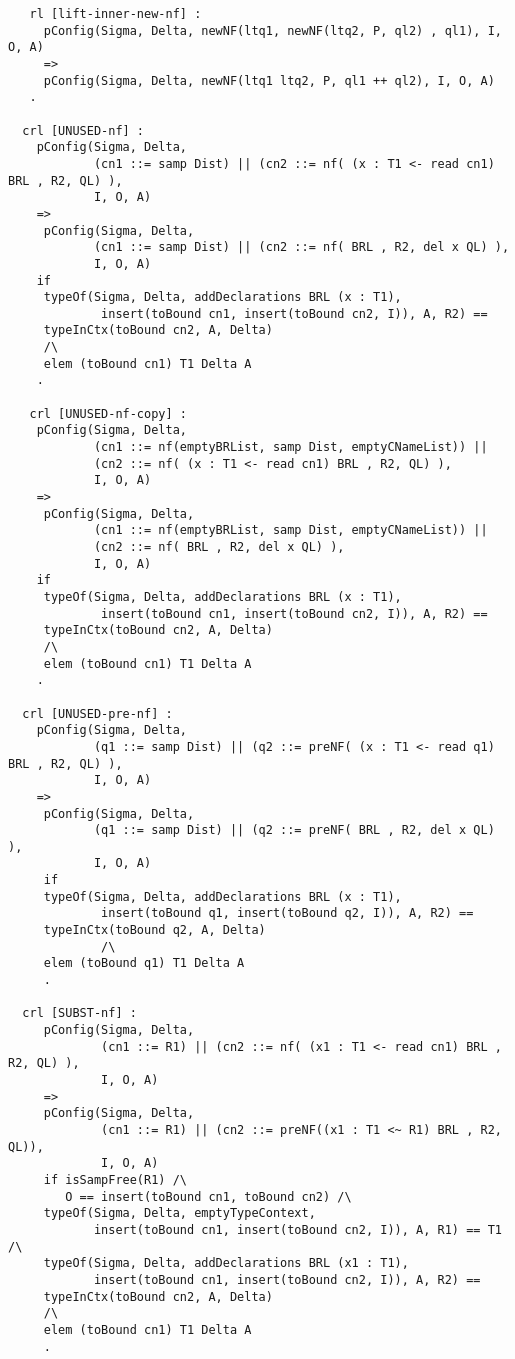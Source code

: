 \begin{lstlisting}
   rl [lift-inner-new-nf] :
     pConfig(Sigma, Delta, newNF(ltq1, newNF(ltq2, P, ql2) , ql1), I, O, A)
     => 
     pConfig(Sigma, Delta, newNF(ltq1 ltq2, P, ql1 ++ ql2), I, O, A)
   .
      
  crl [UNUSED-nf] :
    pConfig(Sigma, Delta,
            (cn1 ::= samp Dist) || (cn2 ::= nf( (x : T1 <- read cn1) BRL , R2, QL) ),
            I, O, A) 
    =>           
     pConfig(Sigma, Delta,
            (cn1 ::= samp Dist) || (cn2 ::= nf( BRL , R2, del x QL) ),
            I, O, A) 
    if
     typeOf(Sigma, Delta, addDeclarations BRL (x : T1), 
             insert(toBound cn1, insert(toBound cn2, I)), A, R2) ==
     typeInCtx(toBound cn2, A, Delta)
     /\
     elem (toBound cn1) T1 Delta A        
    . 
    
   crl [UNUSED-nf-copy] :
    pConfig(Sigma, Delta,
            (cn1 ::= nf(emptyBRList, samp Dist, emptyCNameList)) || 
            (cn2 ::= nf( (x : T1 <- read cn1) BRL , R2, QL) ),
            I, O, A) 
    =>           
     pConfig(Sigma, Delta,
            (cn1 ::= nf(emptyBRList, samp Dist, emptyCNameList)) || 
            (cn2 ::= nf( BRL , R2, del x QL) ),
            I, O, A) 
    if 
     typeOf(Sigma, Delta, addDeclarations BRL (x : T1), 
             insert(toBound cn1, insert(toBound cn2, I)), A, R2) ==
     typeInCtx(toBound cn2, A, Delta)
     /\
     elem (toBound cn1) T1 Delta A
    .    
                   
  crl [UNUSED-pre-nf] :
    pConfig(Sigma, Delta,
            (q1 ::= samp Dist) || (q2 ::= preNF( (x : T1 <- read q1) BRL , R2, QL) ),
            I, O, A) 
    =>           
     pConfig(Sigma, Delta,
            (q1 ::= samp Dist) || (q2 ::= preNF( BRL , R2, del x QL) ),
            I, O, A) 
     if
     typeOf(Sigma, Delta, addDeclarations BRL (x : T1), 
             insert(toBound q1, insert(toBound q2, I)), A, R2) ==
     typeInCtx(toBound q2, A, Delta)
             /\
     elem (toBound q1) T1 Delta A 
     .    
   
  crl [SUBST-nf] : 
     pConfig(Sigma, Delta,
             (cn1 ::= R1) || (cn2 ::= nf( (x1 : T1 <- read cn1) BRL , R2, QL) ),
             I, O, A)  
     => 
     pConfig(Sigma, Delta,
             (cn1 ::= R1) || (cn2 ::= preNF((x1 : T1 <~ R1) BRL , R2, QL)),
             I, O, A) 
     if isSampFree(R1) /\
        O == insert(toBound cn1, toBound cn2) /\ 
     typeOf(Sigma, Delta, emptyTypeContext, 
            insert(toBound cn1, insert(toBound cn2, I)), A, R1) == T1 /\
     typeOf(Sigma, Delta, addDeclarations BRL (x1 : T1), 
            insert(toBound cn1, insert(toBound cn2, I)), A, R2) ==
     typeInCtx(toBound cn2, A, Delta)
     /\
     elem (toBound cn1) T1 Delta A 
     . 
     

\end{lstlisting}

